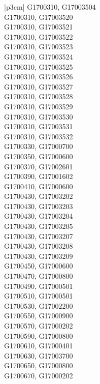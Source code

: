 \begin{customLongTable}{ |p{3cm}| }
G1700310, G17003504 \\ \hline
G1700310, G17003520 \\ \hline
G1700310, G17003521 \\ \hline
G1700310, G17003522 \\ \hline
G1700310, G17003523 \\ \hline
G1700310, G17003524 \\ \hline
G1700310, G17003525 \\ \hline
G1700310, G17003526 \\ \hline
G1700310, G17003527 \\ \hline
G1700310, G17003528 \\ \hline
G1700310, G17003529 \\ \hline
G1700310, G17003530 \\ \hline
G1700310, G17003531 \\ \hline
G1700310, G17003532 \\ \hline
G1700330, G17000700 \\ \hline
G1700350, G17000600 \\ \hline
G1700370, G17002601 \\ \hline
G1700390, G17001602 \\ \hline
G1700410, G17000600 \\ \hline
G1700430, G17003202 \\ \hline
G1700430, G17003203 \\ \hline
G1700430, G17003204 \\ \hline
G1700430, G17003205 \\ \hline
G1700430, G17003207 \\ \hline
G1700430, G17003208 \\ \hline
G1700430, G17003209 \\ \hline
G1700450, G17000600 \\ \hline
G1700470, G17000800 \\ \hline
G1700490, G17000501 \\ \hline
G1700510, G17000501 \\ \hline
G1700530, G17002200 \\ \hline
G1700550, G17000900 \\ \hline
G1700570, G17000202 \\ \hline
G1700590, G17000800 \\ \hline
G1700610, G17000401 \\ \hline
G1700630, G17003700 \\ \hline
G1700650, G17000800 \\ \hline
G1700670, G17000202 \\ \hline

\end{customLongTable}
